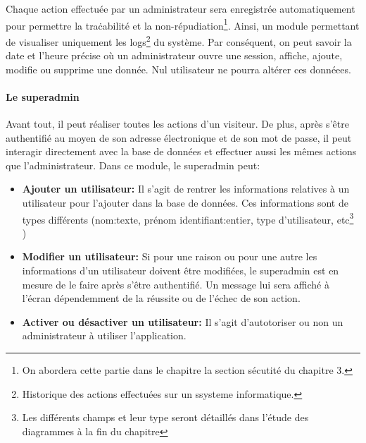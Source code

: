                 \par
                Chaque action effectuée par un administrateur sera enregistrée automatiquement pour permettre la traċabilité
                et la non-répudiation\footnote{On abordera cette partie dans le chapitre la section sécutité du chapitre 3.}.
                Ainsi, un module permettant de visualiser uniquement les logs\footnote{Historique des actions effectuées sur un ssysteme informatique.} du système. Par conséquent, on peut savoir
                la date et l'heure précise où un administrateur ouvre une session, affiche, ajoute, modifie ou supprime une donnée.
                Nul utilisateur ne pourra altérer ces donnéees.
                \par

                \paragraph{Le superadmin}
                Avant tout, il peut réaliser toutes les actions d'un visiteur. De plus, après s'être authentifié au moyen de 
                son adresse électronique et de son mot de passe, il peut interagir directement avec la base de données et 
                effectuer aussi les mêmes actions que l'administrateur.
                Dans ce module, le superadmin peut:
                \begin{itemize}
                        \item \textbf{Ajouter un utilisateur: }
                        Il s'agit de rentrer les informations relatives à un utilisateur pour l'ajouter dans la base de données.
                        Ces informations sont de types différents (nom:texte, prénom identifiant:entier, type d'utilisateur, 
                        etc\footnote{Les différents champs et leur type seront 
                        détaillés dans l'étude des diagrammes à la fin du chapitre} )
                        \item \textbf{Modifier un utilisateur: }
                        Si pour une raison ou pour une autre les informations d'un utilisateur doivent être modifiées, le superadmin est en
                        mesure de le faire après s'être authentifié. Un message lui sera affiché à l'écran dépendemment 
                        de la réussite ou de l'échec de son action.
                        \item \textbf{Activer ou désactiver un utilisateur: }
                        Il s'agit d'autotoriser ou non un administrateur à utiliser l'application.
                \end{itemize}
                  
